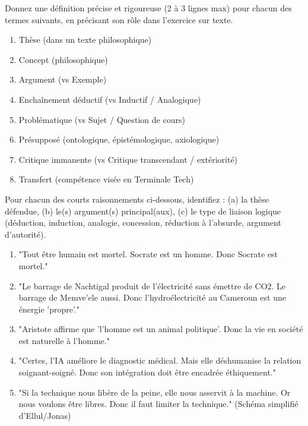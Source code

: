 \documentclass[11pt]{article}
\newcommand{\cle}[1]{{\popxbold\color{popdark}#1}}
\begin{document}
\begin{exercice}
Donnez une définition précise et rigoureuse (2 à 3 lignes max) pour chacun des termes suivants, en précisant son rôle dans l'exercice sur texte.
\begin{enumerate}
    \item \cle{Thèse} (dans un texte philosophique)
    \item \cle{Concept} (philosophique)
    \item \cle{Argument} (vs Exemple)
    \item \cle{Enchaînement déductif} (vs Inductif / Analogique)
    \item \cle{Problématique} (vs Sujet / Question de cours)
    \item \cle{Présupposé} (ontologique, épistémologique, axiologique)
    \item \cle{Critique immanente} (vs Critique transcendant / extériorité)
    \item \cle{Transfert} (compétence visée en Terminale Tech)
\end{enumerate}
\end{exercice}

\begin{exercice}
Pour chacun des courts raisonnements ci-dessous, identifiez : (a) la thèse défendue, (b) le(s) argument(s) principal(aux), (c) le type de liaison logique (déduction, induction, analogie, concession, réduction à l'absurde, argument d'autorité).
\begin{enumerate}
    \item "Tout être humain est mortel. Socrate est un homme. Donc Socrate est mortel."
    \item "Le barrage de Nachtigal produit de l'électricité sans émettre de CO2. Le barrage de Memve'ele aussi. Donc l'hydroélectricité au Cameroun est une énergie 'propre'."
    \item "Aristote affirme que 'l'homme est un animal politique'. Donc la vie en société est naturelle à l'homme."
    \item "Certes, l'IA améliore le diagnostic médical. Mais elle déshumanise la relation soignant-soigné. Donc son intégration doit être encadrée éthiquement."
    \item "Si la technique nous libère de la peine, elle nous asservit à la machine. Or nous voulons être libres. Donc il faut limiter la technique." (Schéma simplifié d'Ellul/Jonas)
\end{enumerate}
\end{exercice}
\end{document}
